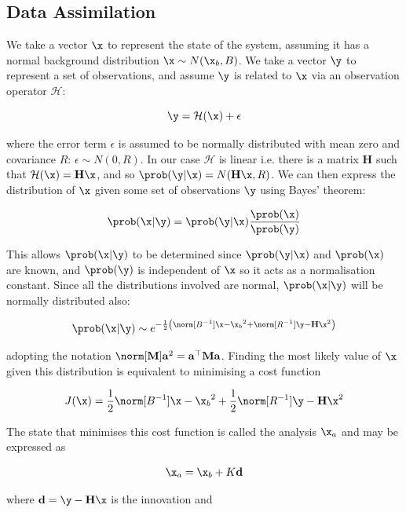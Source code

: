 \subsection{Data Assimilation}

We take a vector $\x$ to represent the state of the system, assuming it has a normal background distribution $\x \sim N(\x_b,B)$. We take a vector $\y$ to represent a set of observations, and assume $\y$ is related to $\x$ via an observation operator $\mathcal{H}$:

\[
\y = \mathcal{H}(\x) + \epsilon
\]

where the error term $\epsilon$ is assumed to be normally distributed with mean zero and covariance $R$: $\epsilon \sim N(0,R)$. In our case $\mathcal{H}$ is linear i.e. there is a matrix $\mathbf{H}$ such that $\mathcal{H}(\x) = \mathbf{H}\x$, and so $\prob(\y|\x) = N(\mathbf{H}\x,R)$. We can then express the distribution of $\x$ given some set of observations $\y$ using Bayes' theorem:

\begin{equation}
    \prob(\x|\y) = \prob(\y|\x) \frac{\prob(\x)}{\prob(\y)}
\end{equation}

This allows $\prob(\x|\y)$ to be determined since $\prob(\y|\x)$ and $\prob(\x)$ are known, and $\prob(\y)$ is independent of $\x$ so it acts as a normalisation constant. Since all the distributions involved are normal, $\prob(\x|\y)$ will be normally distributed also:

\begin{equation}
    \prob(\x|\y) \sim e^{-\frac 1 2 \left( \norm[B^{-1}]{\x - \x_b}^2 + \norm[R^{-1}]{\y - \mathbf{H}\x}^2\right)}
\end{equation}

adopting the notation $\norm[\mathbf{M}]{\mathbf{a}}^2 = \mathbf{a}^\top \mathbf{M} \mathbf{a}$. Finding the most likely value of $\x$ given this distribution is equivalent to minimising a cost function

\begin{equation}
    J(\x) = \frac 1 2 \norm[B^{-1}]{\x - \x_b}^2 + \frac 1 2 \norm[R^{-1}]{\y - \mathbf{H}\x}^2
\end{equation}

The state that minimises this cost function is called the analysis $\x_a$ and may be expressed as

\[
    \x_a = \x_b + K\mathbf{d}
\]

where $\mathbf{d} = \y - \mathbf{H}\x$ is the innovation and

